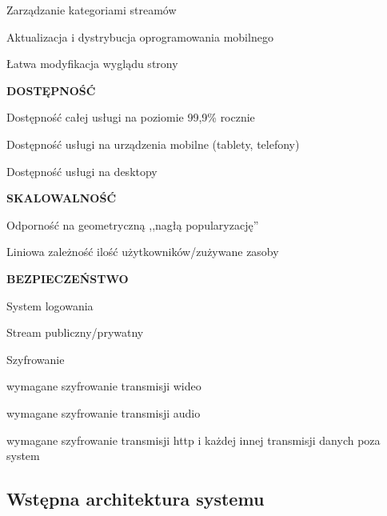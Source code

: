 \begin{packed_item}
{\begin{packed_item}
            \item{Zarządzanie kategoriami streamów}
            \item{Aktualizacja i dystrybucja oprogramowania mobilnego}
            \item{Łatwa modyfikacja wyglądu strony}
        \end{packed_item}
    }
    \item{
        \textbf{DOSTĘPNOŚĆ}
        \begin{packed_item}
            \item{Dostępność całej usługi na poziomie 99,9\% rocznie}
            \item{Dostępność usługi na urządzenia mobilne (tablety, telefony)}
            \item{Dostępność usługi na desktopy}
        \end{packed_item}
    }
    \item{
        \textbf{SKALOWALNOŚĆ}
        \begin{packed_item}
            \item{Odporność na geometryczną ,,nagłą popularyzację''}
            \item{Liniowa zależność ilość użytkowników/zużywane zasoby}
        \end{packed_item}
    }
    \item{
        \textbf{BEZPIECZEŃSTWO}
        \begin{packed_item}
            \item{
                System logowania
            }
            \item{
                Stream publiczny/prywatny
            }
            \item{
                Szyfrowanie
                \begin{packed_item}
                    \item{wymagane szyfrowanie transmisji wideo}
                    \item{wymagane szyfrowanie transmisji audio}
                    \item{wymagane szyfrowanie transmisji http i każdej innej transmisji danych poza system}
                \end{packed_item}
            }
        \end{packed_item}
    }
\end{packed_item}

\subsection{Wstępna architektura systemu}
\label{sec:EtapIwstepnaArchitekturaSystemu}

